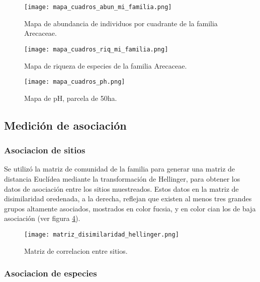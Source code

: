 \documentclass[11pt,]{article}
\begin{document}
\begin{figure}
\centering
\texttt{[image: mapa\_cuadros\_abun\_mi\_familia.png]}
\caption{Mapa de abundancia de individuos por cuadrante de la familia
Arecaceae. \label{fig:mapa_cuadros_abun_mi_familia}}
\end{figure}

\begin{figure}
\centering
\texttt{[image: mapa\_cuadros\_riq\_mi\_familia.png]}
\caption{Mapa de riqueza de especies de la familia Arecaceae.
\label{fig:mapa_cuadros_riq_mi_familia}}
\end{figure}

\begin{figure}
\centering
\texttt{[image: mapa\_cuadros\_ph.png]}
\caption{Mapa de pH, parcela de 50ha. \label{fig:mapa_cuadros_pH}}
\end{figure}

\subsection{Medición de asociación}\label{mediciuxf3n-de-asociaciuxf3n}

\subsubsection{Asociacion de sitios}\label{asociacion-de-sitios}

Se utilizó la matriz de comunidad de la familia para generar una matriz
de distancia Euclídea mediante la transformación de Hellinger, para
obtener los datos de asociación entre los sitios muestreados. Estos
datos en la matriz de disimilaridad oredenada, a la derecha, reflejan
que existen al menos tres grandes grupos altamente asociados, mostrados
en color fucsia, y en color cian los de baja asociación (ver figura
\ref{fig:matriz_disimilaridad_hellinger}).

\begin{figure}
\centering
\texttt{[image: matriz\_disimilaridad\_hellinger.png]}
\caption{Matriz de correlacion entre sitios.
\label{fig:matriz_disimilaridad_hellinger}}
\end{figure}

\subsubsection{Asociacion de especies}\label{asociacion-de-especies}
\end{document}
